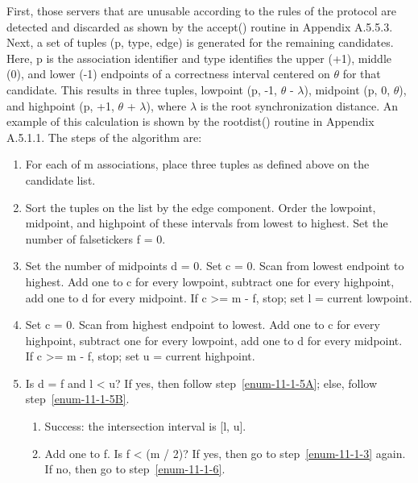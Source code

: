 First, those servers that are unusable according to the rules of the
protocol are detected and discarded as shown by the accept() routine
in Appendix A.5.5.3.  Next, a set of tuples (p, type, edge) is
generated for the remaining candidates.  Here, p is the association
identifier and type identifies the upper (+1), middle (0), and lower
(-1) endpoints of a correctness interval centered on $ \theta $ for that
candidate.  This results in three tuples, lowpoint (p, -1, $ \theta $ -
$ \lambda $), midpoint (p, 0, $ \theta $), and highpoint (p, +1, $ \theta $ +
$ \lambda $), where $ \lambda $ is the root synchronization distance.  An
example of this calculation is shown by the rootdist() routine in
Appendix A.5.1.1.  The steps of the algorithm are:

\begin{enumerate}
  \item For each of m associations, place three tuples as defined above
    on the candidate list.

  \item Sort the tuples on the list by the edge component.  Order the
    lowpoint, midpoint, and highpoint of these intervals from lowest to
    highest.  Set the number of falsetickers f = 0.

  \item \label{enum-11-1-3} Set the number of midpoints d = 0.  Set c = 0.  Scan from lowest
    endpoint to highest.  Add one to c for every lowpoint, subtract one
    for every highpoint, add one to d for every midpoint.  If c >= m - f,
    stop; set l = current lowpoint.

  \item Set c = 0.  Scan from highest endpoint to lowest.  Add one to c
    for every highpoint, subtract one for every lowpoint, add one to d
    for every midpoint.  If c >= m - f, stop; set u = current highpoint.

  \item \label{enum-11-1-5} Is d = f and l < u?  If yes, then follow step~\ref{enum-11-1-5A}; else, follow
    step~\ref{enum-11-1-5B}.

    \begin{enumerate}
      \item \label{enum-11-1-5A} Success: the intersection interval is [l, u].

      \item \label{enum-11-1-5B} Add one to f.  Is f < (m / 2)?  If yes, then go to step~\ref{enum-11-1-3} again.
        If no, then go to step~\ref{enum-11-1-6}.
    \end{enumerate}


\end{enumerate}
